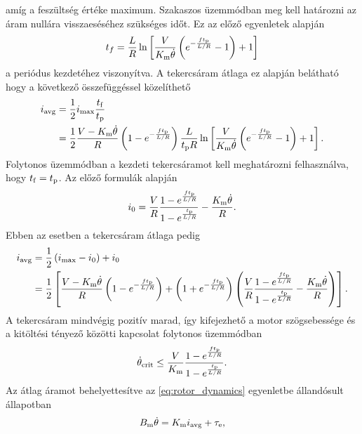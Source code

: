 amíg a feszültség értéke maximum. Szakaszos üzemmódban meg kell határozni az áram nullára visszaeséséhez szükséges időt. 
Ez az előző egyenletek alapján 
\begin{equation}
    t_f = \frac{L}{R}\ln\left[\frac{V}{K_{\mathrm{m}}\dot\theta}\left(e^{-\frac{ft_{\mathrm{p}}}{L/R}} - 1\right) + 1\right]
\end{equation}
a periódus kezdetéhez viszonyítva.
A tekercsáram átlaga ez alapján belátható hogy a következő összefüggéssel közelíthető
\begin{equation}
    \begin{split}
    i_{\mathrm{avg}} &= \frac{1}{2}i_{\mathrm{max}}\frac{t_{\mathrm{f}}}{t_{\mathrm{p}}} \\
               &= \frac{1}{2}\frac{V-K_{\mathrm{m}}\dot\theta}{R}\left(1-e^{-\frac{ft_{\mathrm{p}}}{L/R}} \right)\frac{L}{t_{\mathrm{p}} R}\ln\left[\frac{V}{K_{\mathrm{m}}\dot\theta}\left(e^{-\frac{ft_{\mathrm{p}}}{L/R}} - 1\right) + 1\right].
    \end{split}
\end{equation}
Folytonos üzemmódban a kezdeti tekercsáramot kell meghatározni felhasználva, hogy \(t_{\mathrm{f}} = t_{\mathrm{p}}\).
Az előző formulák alapján 
\begin{equation}
    i_0 = \frac{V}{R}\frac{1-e^{\frac{ft_{\mathrm{p}}}{L/R}}}{1-e^{\frac{t_{\mathrm{p}}}{L/R}}} - \frac{K_{\mathrm{m}}\dot\theta}{R}.
\end{equation}
Ebben az esetben a tekercsáram átlaga pedig
\begin{equation}
    \begin{split}
    i_{\mathrm{avg}} &= \frac{1}{2}\left(i_{\mathrm{max}}-i_0\right) + i_0 \\
               &= \frac{1}{2}\left[\frac{V-K_{\mathrm{m}}\dot\theta}{R}\left(1-e^{-\frac{ft_{\mathrm{p}}}{L/R}} \right) + 
               \left(1+e^{-\frac{ft_{\mathrm{p}}}{L/R}} \right)
               \left(\frac{V}{R}\frac{1-e^{\frac{ft_{\mathrm{p}}}{L/R}}}{1-e^{\frac{t_{\mathrm{p}}}{L/R}}} - \frac{K_{\mathrm{m}}\dot\theta}{R}\right)\right].
    \end{split}
\end{equation}
A tekercsáram mindvégig pozitív marad, így kifejezhető a motor szögsebessége és a kitöltési tényező közötti 
kapcsolat folytonos üzemmódban 
\begin{equation}
    \dot\theta_{\mathrm{crit}} \le \frac{V}{K_{\mathrm{m}}}\frac{1-e^{\frac{ft_{\mathrm{p}}}{L/R}}}{1-e^{\frac{t_{\mathrm{p}}}{L/R}}}.
\end{equation}
Az átlag áramot behelyettesítve az \eqref{eq:rotor_dynamics} egyenletbe állandósult állapotban 
\begin{equation}
    B_{\mathrm{m}}\dot\theta = K_{\mathrm{m}} i_{\mathrm{avg}} + \tau_{\mathrm{e}},
\end{equation}
